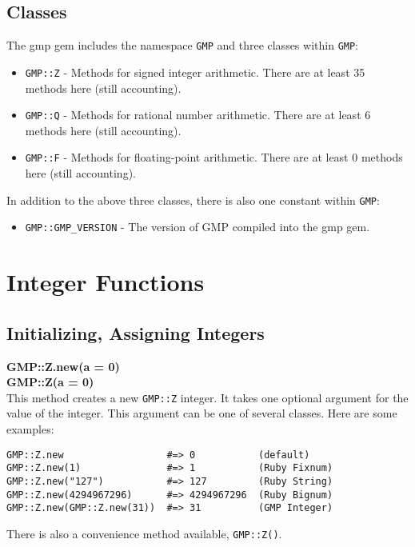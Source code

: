 \documentclass[pdftex,10pt]{article}
\begin{document}
\subsection{Classes}
The gmp gem includes the namespace \texttt{GMP} and three classes within \texttt{GMP}:
\begin{itemize}
  \item \texttt{GMP::Z} - Methods for signed integer arithmetic. There are at least 35
    methods here (still accounting).
  \item \texttt{GMP::Q} - Methods for rational number arithmetic. There are at least 6
    methods here (still accounting).
  \item \texttt{GMP::F} - Methods for floating-point arithmetic. There are at least 0
    methods here (still accounting).
\end{itemize}

In addition to the above three classes, there is also one constant within \texttt{GMP}:
\begin{itemize}
  \item \texttt{GMP::GMP\_VERSION} - The version of GMP compiled into the gmp gem.
\end{itemize}

\section{Integer Functions}

\subsection{Initializing, Assigning Integers}

\large{\textbf{GMP::Z.new(a = 0)}}\\
\large{\textbf{GMP::Z(a = 0)}}\\
This method creates a new \texttt{GMP::Z} integer. It takes one optional argument for the
value of the integer. This argument can be one of several classes. Here are some
examples:
\begin{verbatim}
GMP::Z.new                  #=> 0           (default)
GMP::Z.new(1)               #=> 1           (Ruby Fixnum)
GMP::Z.new("127")           #=> 127         (Ruby String)
GMP::Z.new(4294967296)      #=> 4294967296  (Ruby Bignum)
GMP::Z.new(GMP::Z.new(31))  #=> 31          (GMP Integer)
\end{verbatim}

There is also a convenience method available, \texttt{GMP::Z()}.\\
\end{document}
